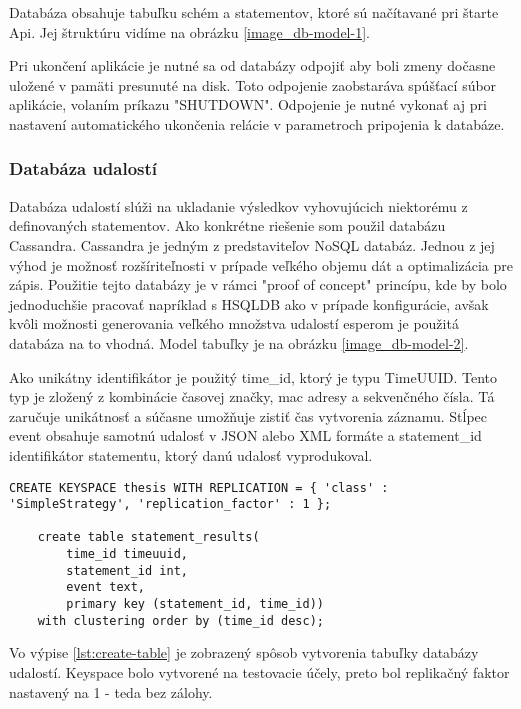 		Databáza obsahuje tabuľku schém a statementov, ktoré sú načítavané pri štarte Api. Jej štruktúru vidíme na obrázku \ref{image_db-model-1}.
		
		Pri ukončení aplikácie je nutné sa od databázy odpojiť aby boli zmeny dočasne uložené v pamäti presunuté na disk. Toto odpojenie zaobstaráva spúšťací súbor aplikácie, volaním príkazu "SHUTDOWN". Odpojenie je nutné vykonať aj pri nastavení automatického ukončenia relácie v parametroch pripojenia k databáze.
			
		\subsubsection{Databáza udalostí}
		Databáza udalostí slúži na ukladanie výsledkov vyhovujúcich niektorému z definovaných statementov. Ako konkrétne riešenie som použil databázu Cassandra. Cassandra je jedným z predstaviteľov NoSQL databáz. Jednou z jej výhod je možnosť rozšíriteľnosti v prípade veľkého objemu dát a optimalizácia pre zápis. Použitie tejto databázy je v rámci "proof of concept" princípu, kde by bolo jednoduchšie pracovať napríklad s HSQLDB ako v prípade konfigurácie, avšak kvôli možnosti generovania veľkého množstva udalostí esperom je použitá databáza na to vhodná. Model tabuľky je na obrázku \ref{image_db-model-2}.

		Ako unikátny identifikátor je použitý time\_id, ktorý je typu TimeUUID. Tento typ je zložený z kombinácie časovej značky, mac adresy a sekvenčného čísla. Tá zaručuje unikátnosť a súčasne umožňuje zistiť čas vytvorenia záznamu. Stĺpec event obsahuje samotnú udalosť v JSON alebo XML formáte a statement\_id identifikátor statementu, ktorý danú udalosť vyprodukoval.
	
		\begin{lstlisting}[label=lst:create-table,caption=Vytvorenie keyspace a tabuľky databázy udalostí]
	CREATE KEYSPACE thesis WITH REPLICATION = { 'class' : 'SimpleStrategy', 'replication_factor' : 1 };

	create table statement_results(
		time_id timeuuid,
		statement_id int,
		event text,
		primary key (statement_id, time_id))
	with clustering order by (time_id desc);
		\end{lstlisting}
		
		Vo výpise \ref{lst:create-table} je zobrazený spôsob vytvorenia tabuľky databázy udalostí. Keyspace bolo vytvorené na testovacie účely, preto bol replikačný faktor nastavený na 1 - teda bez zálohy.
		
